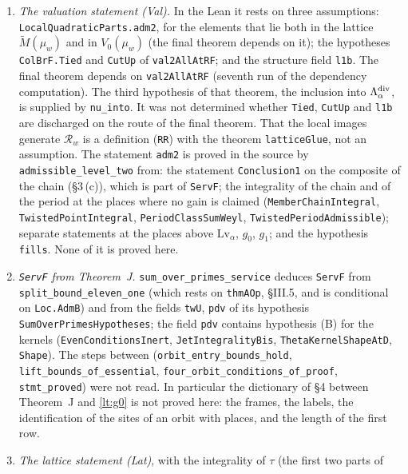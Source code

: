 \documentclass[11pt,letterpaper]{article}
\begin{document}
\begin{enumerate}[label=\textup{(\roman*)},leftmargin=2.4em]
\item \emph{The valuation statement \textup{(Val)}.} In the Lean it rests on three assumptions:
\texttt{LocalQuadraticParts.adm2}, for the elements that lie both in the lattice $\widetilde M(\mu_w)$
and in $V_0(\mu_w)$ (the final theorem depends on it); the hypotheses \texttt{ColBrF.Tied}
and \texttt{CutUp} of \texttt{val2AllAtRF}; and the structure field \texttt{l1b}. The final theorem depends
on \texttt{val2AllAtRF} (seventh run of the dependency computation). The third hypothesis of that theorem,
the inclusion into $\Lambda^{\rm div}_\alpha$, is supplied by \texttt{nu\_into}. It was not determined
whether \texttt{Tied}, \texttt{CutUp} and \texttt{l1b} are discharged on the route of the final theorem.
That the local images generate
$\mathcal R_w$ is a definition (\texttt{RR}) with the theorem \texttt{latticeGlue}, not an assumption. The
statement \texttt{adm2} is proved in the source by \texttt{admissible\_level\_two} from: the statement
\texttt{Conclusion1} on the composite of the chain (\S3\,(c)), which is part of \texttt{ServF}; the
integrality of the chain and of the period at the places where no gain is claimed
(\texttt{MemberChainIntegral}, \texttt{TwistedPointIntegral}, \texttt{PeriodClassSumWeyl},
\texttt{TwistedPeriodAdmissible}); separate statements at the places above $\mathrm{Lv}_\alpha$, $g_0$,
$g_1$; and the hypothesis \texttt{fills}. None of it is proved here.
\item \emph{\texttt{ServF} from Theorem~J.} \texttt{sum\_over\_primes\_service} deduces \texttt{ServF}
from \texttt{split\_bound\_eleven\_one} (which rests on \texttt{thmAOp}, \S III.5, and is conditional on
\texttt{Loc.AdmB}) and from the fields \texttt{twU}, \texttt{pdv} of its hypothesis
\texttt{SumOverPrimesHypotheses}; the
field \texttt{pdv} contains hypothesis (B) for the kernels (\texttt{EvenConditionsInert},
\texttt{JetIntegralityBis}, \texttt{ThetaKernelShapeAtD}, \texttt{Shape}). The steps between
(\texttt{orbit\_entry\_bounds\_hold}, \texttt{lift\_bounds\_of\_essential},
\texttt{four\_orbit\_conditions\_of\_proof}, \texttt{stmt\_proved}) were not read. In particular the
dictionary of \S4 between Theorem~J and \eqref{lt:g0} is not proved here: the frames, the labels, the
identification of the sites of an orbit with places, and the length of the first row.
\item \emph{The lattice statement \textup{(Lat)}}, with the integrality of $\tau$ (the first two parts of

\end{enumerate}
\end{document}
